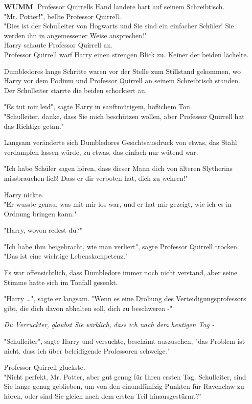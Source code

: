 {\textbf{WUMM}. Professor Quirrells Hand landete hart auf seinem Schreibtisch.\\ "Mr. Potter!", bellte Professor Quirrell.\\ "Dies ist der Schulleiter von Hogwarts und Sie sind ein einfacher Schüler! Sie werden ihn in angemessener Weise ansprechen!"\\ Harry schaute Professor Quirrell an.\\ Professor Quirrell warf Harry einen strengen Blick zu. Keiner der beiden lächelte.

Dumbledores lange Schritte waren vor der Stelle zum Stillstand gekommen, wo Harry vor dem Podium und Professor Quirrell an seinem Schreibtisch standen.\\ Der Schulleiter starrte die beiden schockiert an.

"Es tut mir leid", sagte Harry in sanftmütigem, höflichem Ton.\\ "Schulleiter, danke, dass Sie mich beschützen wollen, aber Professor Quirrell hat das Richtige getan."

Langsam veränderte sich Dumbledores Gesichtsausdruck von etwas, das Stahl verdampfen lassen würde, zu etwas, das einfach nur wütend war.

"Ich habe Schüler sagen hören, dass dieser Mann dich von älteren Slytherins missbrauchen ließ! Dass er dir verboten hat, dich zu wehren!"

Harry nickte.\\ "Er wusste genau, was mit mir los war, und er hat mir gezeigt, wie ich es in Ordnung bringen kann."

"Harry, wovon redest du?"

"Ich habe ihm beigebracht, wie man verliert", sagte Professor Quirrell trocken. "Das ist eine wichtige Lebenskompetenz."

Es war offensichtlich, dass Dumbledore immer noch nicht verstand, aber seine Stimme hatte sich im Tonfall gesenkt.

"Harry …", sagte er langsam. "Wenn es eine Drohung des Verteidigungsprofessors gibt, die dich davon abhalten soll, dich zu beschweren -"

\emph{Du Verrückter, glaubst Sie wirklich, dass ich nach dem heutigen Tag -}

"Schulleiter", sagte Harry und versuchte, beschämt auszusehen, "das Problem ist nicht, dass ich über beleidigende Professoren schweige."

Professor Quirrell gluckste.\\ "Nicht perfekt, Mr. Potter, aber gut genug für Ihren ersten Tag. Schulleiter, sind Sie lange genug geblieben, um von den einundfünfzig Punkten für Ravenclaw zu hören, oder sind Sie gleich nach dem ersten Teil hinausgestürmt?"

}
